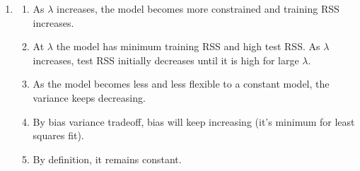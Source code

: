 \documentclass[11pt, a4paper]{article}
\begin{document}
\begin{enumerate}
        \item
        \begin{enumerate}
            \item As $\lambda$ increases, the model becomes more constrained and training RSS increases.
            \item At $\lambda$ the model has minimum training RSS and high test RSS. As $\lambda$ increases, test RSS initially decreases until it is high for large $\lambda$.
            \item As the model becomes less and less flexible to a constant model, the variance keeps decreasing.
            \item By bias variance tradeoff, bias will keep increasing (it's minimum for least squares fit).
            \item By definition, it remains constant.
        \end{enumerate}
        

\end{enumerate}
\end{document}
